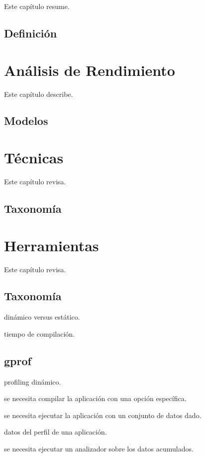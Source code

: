 \documentclass[a4paper]{report}
\begin{document}
Este cap\'itulo resume.

\section{Definici\'on}

\chapter{An\'alisis de Rendimiento}

Este cap\'itulo describe.

\section{Modelos}

\chapter{T\'ecnicas}

Este cap\'itulo revisa.

\section{Taxonom\'ia}

\chapter{Herramientas}

Este cap\'itulo revisa.

\section{Taxonom\'ia}

din\'amico versus est\'atico.

tiempo de compilaci\'on.

\section{gprof}

profiling din\'amico.

se necesita compilar la aplicaci\'on con una opci\'on espec\'ifica.

se necesita ejecutar la aplicaci\'on con un conjunto de datos dado.

datos del perfil de una aplicaci\'on.

se necesita ejecutar un analizador sobre los datos acumulados.
\end{document}
